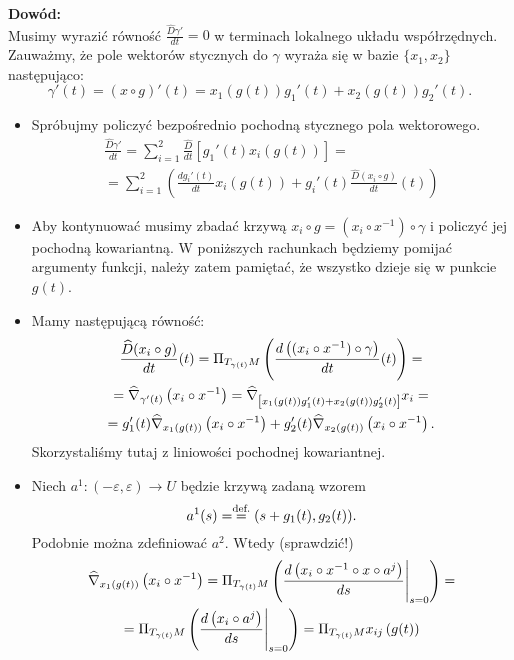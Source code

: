 \textcolor{ared}{\textbf{Dowód:}}\\
Musimy wyrazić równość $\frac{\widehat{D}\gamma'}{dt}=0$ w terminach lokalnego układu współrzędnych. 
Zauważmy, że pole wektorów stycznych do $\gamma$ wyraża się w bazie $\{x_1,x_2\}$ następująco:\[\gamma'(t)=(x\circ g)'(t)=x_1(g(t))g_1'(t)+x_2(g(t))g_2'(t).\]
\begin{itemize}
\item Spróbujmy policzyć bezpośrednio pochodną stycznego pola wektorowego.
\begin{multline}\label{eqn:loc-geod}
\frac{\widehat{D}\gamma'}{dt}=\sum_{i=1}^2 \frac{\widehat{D}}{dt}\left[g_1'(t) x_i(g(t))\right]=\\
=\sum_{i=1}^2\left(\frac{d g_i'(t)}{dt}x_i(g(t))+g_i'(t)\frac{\widehat{D}(x_{i}\circ g)}{dt}(t)\right)
\end{multline}

\item Aby kontynuować musimy zbadać krzywą $x_i\circ g=(x_i\circ x^{-1})\circ \gamma$ i policzyć jej pochodną
kowariantną. W poniższych rachunkach będziemy pomijać argumenty funkcji, należy zatem pamiętać, że wszystko dzieje się w punkcie $g(t)$.

\item Mamy następującą równość:
\begin{multline*}
\frac{\widehat{D}(x_i\circ g)}{dt}(t)=
\Pi_{T_{\gamma(t)}M}\left(\frac{d\left((x_i\circ x^{-1})\circ \gamma\right)}{dt}(t)\right)=\\ =\widehat{\nabla}_{\gamma'(t)}\left(x_i\circ x^{-1}\right)=\widehat{\nabla}_{\left[x_1(g(t))g_1'(t)+x_2(g(t))g_2'(t)\right]}x_i=\\
=g_1'(t)\widehat{\nabla}_{x_1(g(t))}\left(x_i\circ x^{-1}\right)+g_2'(t)\widehat{\nabla}_{x_2(g(t))}\left(x_i\circ x^{-1}\right).
\end{multline*}
Skorzystaliśmy tutaj z liniowości pochodnej kowariantnej. 

\item Niech $a^{1}\colon (-\varepsilon,\varepsilon)\to U$ będzie krzywą zadaną wzorem
\[a^{1}(s)=\define(s+g_1(t),g_2(t)).\] Podobnie można zdefiniować $a^{2}$. Wtedy (sprawdzić!)
\begin{multline*}
\widehat{\nabla}_{x_1(g(t))}\left(x_i\circ x^{-1}\right)=\Pi_{T_{\gamma(t)}M}\left(\frac{d\left( x_i\circ x^{-1}\circ x\circ a^{j}\right)}{ds}\Bigg|_{s=0}\right)=\\
=\Pi_{T_{\gamma(t)}M}\left(\frac{d\left(x_i\circ a^{j}\right)}{ds}\Bigg|_{s=0}\right)=\Pi_{T_{\gamma(t)}M}x_{ij}\left(g(t)\right)
\end{multline*}


\end{itemize}
